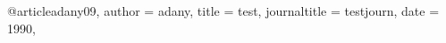 @article{adany09,
	author = {adany},
	title = {test},
	journaltitle = {testjourn},
	date = {1990},
}
